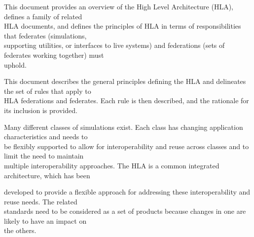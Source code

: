 
\vspace*{0.62in}

\vspace{6.7pt}
\vspace{-3.1pt}
This document provides an overview of the High Level Architecture (HLA), defines a family of related\\
HLA documents, and defines the principles of HLA in terms of responsibilities that federates (simulations,\\
supporting utilities, or interfaces to live systems) and federations (sets of federates working together) must\\
uphold.

\vspace{4.2pt}
This document describes the general principles defining the HLA and delineates the set of rules that apply to\\
HLA federations and federates. Each rule is then described, and the rationale for its inclusion is provided.

\vspace{6pt}
Many different classes of simulations exist. Each class has changing application characteristics and needs to\\
be flexibly supported to allow for interoperability and reuse across classes and to limit the need to maintain\\
multiple interoperability approaches. The HLA is a common integrated architecture, which has been

\newpage

developed to provide a flexible approach for addressing these interoperability and reuse needs. The related\\
standards need to be considered as a set of products because changes in one are likely to have an impact on\\
the others.

